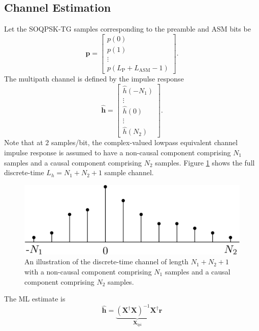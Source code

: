 \subsection{Channel Estimation}
\label{sec:channel_estimation}
Let the SOQPSK-TG samples corresponding to the preamble and ASM bits be
\begin{equation}
\mathbf{p} = 
\begin{bmatrix}
p(0) \\
p(1) \\
\vdots \\
p(L_\text{P} + L_\text{ASM}-1)
\end{bmatrix}.
\label{eq:preamble_ASM}
\end{equation}
The multipath channel is defined by the impulse response 
\begin{equation}
\mathbf{\hat{h}} = 
\begin{bmatrix}
\hat{h}(-N_1) \\ \vdots \\ \hat{h}(0) \\ \vdots \\ \hat{h}(N_2)
\end{bmatrix}.
\end{equation}
Note that at $2$ samples/bit, the complex-valued lowpass equivalent channel impulse response is assumed to have a non-causal component comprising $N_1$ samples and a causal component comprising $N_2$ samples.
Figure \ref{fig:channelExample} shows the full discrete-time $L_h = N_1+N_2+1$ sample channel.
\begin{figure}
	\centering\includegraphics[width=5.5in/100*55]{figures/intro/channelExample.pdf}
	\caption{An illustration of the discrete-time channel of length $N_1+N_2+1$ with a non-causal component comprising $N_1$ samples and a causal component comprising $N_2$ samples.}
	\label{fig:channelExample}
\end{figure}
The ML estimate is \cite[eq. 8]{rice-afran-saquib-cole-rhodes-moazzami:2014} 
\begin{equation}
\hat{\mathbf{h}} = \underbrace{ \left( \mathbf{X}^\dag\mathbf{X} \right)^{-1} \mathbf{X}^\dag}_{\mathbf{X}_\text{lpi}}\mathbf{r}
\end{equation}
